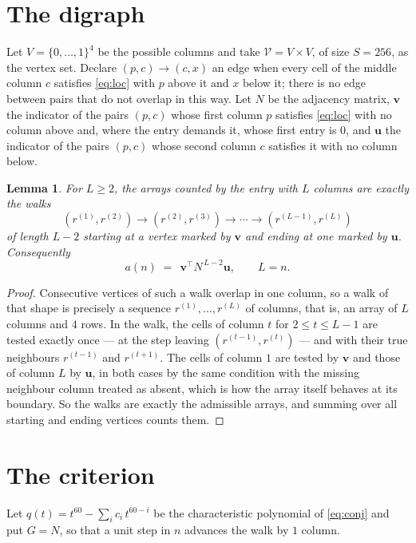 \documentclass[11pt,a4paper]{article}
\theoremstyle{plain}
\newtheorem{lemma}[theorem]{Lemma}
\theoremstyle{definition}
\begin{document}
\section{The digraph}

Let $V=\{0,\dots,1\}^{4}$ be the possible columns and take
$\mathcal V=V\times V$, of size $S=256$, as the vertex set. Declare $(p,c)\to(c,x)$ an edge
when every cell of the middle column $c$ satisfies \eqref{eq:loc} with $p$ above it and $x$
below it; there is no edge between pairs that do not overlap in this way. Let $N$ be the
adjacency matrix, $\mathbf{v}$ the indicator of the pairs $(p,c)$ whose first column $p$
satisfies \eqref{eq:loc} with no column above and, where the entry demands it, whose first entry is $0$, and $\mathbf{u}$ the indicator of
the pairs $(p,c)$ whose second column $c$ satisfies it with no column below.

\begin{lemma}\label{lem:walk}
For $L\ge2$, the arrays counted by the entry with $L$ columns are exactly the walks
\[
(r^{(1)},r^{(2)})\to(r^{(2)},r^{(3)})\to\cdots\to(r^{(L-1)},r^{(L)})
\]
of length $L-2$ starting at a vertex marked by $\mathbf{v}$ and ending at one marked by
$\mathbf{u}$. Consequently
\[
a(n)\;=\;\,\mathbf{v}^{\!\top}N^{\,L-2}\mathbf{u},\qquad L=n .
\]
\end{lemma}

\begin{proof}
Consecutive vertices of such a walk overlap in one column, so a walk of that shape is
precisely a sequence $r^{(1)},\dots,r^{(L)}$ of columns, that is, an array of $L$ columns
and $4$ rows. In the walk, the cells of column $t$ for $2\le t\le L-1$ are tested
exactly once --- at the step leaving $(r^{(t-1)},r^{(t)})$ --- and with their true
neighbours $r^{(t-1)}$ and $r^{(t+1)}$. The cells of column $1$ are tested by
$\mathbf{v}$ and those of column $L$ by $\mathbf{u}$, in both cases by the same condition
with the missing neighbour column treated as absent, which is how the array itself behaves at
its boundary. So the walks are exactly the admissible arrays, and summing over all starting
and ending vertices counts them.
\end{proof}

\section{The criterion}

Let $q(t)=t^{60}-\sum_i c_i\,t^{60-i}$ be the characteristic polynomial of
\eqref{eq:conj} and put $G=N$, so that a unit step in $n$ advances the walk by
$1$ column.
\end{document}
